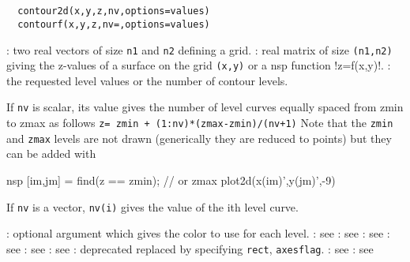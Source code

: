 \begin{mandesc}
  \\
  \\
\end{mandesc}
\begin{calling_sequence}
\begin{verbatim}
  contour2d(x,y,z,nv,options=values)
  contourf(x,y,z,nv=,options=values)
\end{verbatim}
\end{calling_sequence}

\begin{parameters}
  \begin{varlist}
    : two real vectors of size \verb!n1! and \verb!n2! defining a grid.
    : real matrix of size \verb!(n1,n2)! giving the z-values of a surface on the grid
    \verb!(x,y)! or a nsp function !z=f(x,y)!.
    : the requested level values or the number of contour levels.
    \begin{varlist}
      \vname{-}If \verb!nv! is scalar, its value gives the
      number of level curves equally spaced from zmin to zmax as
      follows \verb!z= zmin + (1:nv)*(zmax-zmin)/(nv+1)!
      Note that the \verb!zmin! and \verb!zmax!
      levels are not drawn (generically they are reduced to points)
      but they can be added with
      \begin{mintednsp}{nsp}
        [im,jm] = find(z == zmin); // or zmax
        plot2d(x(im)',y(jm)',-9)
      \end{mintednsp}
      \vname{-}If \verb!nv! is a vector, \verb!nv(i)! gives
      the value of the ith level curve.
    \end{varlist}
    : optional argument which gives the color to use for each level.
    : see 
    : see 
    : see 
    : see 
    : see 
    : see 
    : deprecated replaced by specifying \verb!rect!, \verb!axesflag!.
    : see 
    : see 
  \end{varlist}
\end{parameters}

